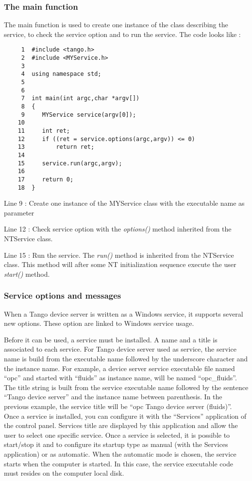 \subsubsection{The main function}

The main function is used to create one instance of the class describing
the service, to check the service option and to run the service. The
code looks like :


\begin{verbatim}
     1  #include <tango.h>
     2  #include <MYService.h>
     3  
     4  using namespace std;
     5  
     6  
     7  int main(int argc,char *argv[])
     8  {
     9     MYService service(argv[0]);
    10          
    11     int ret;
    12     if ((ret = service.options(argc,argv)) <= 0)
    13         return ret;
    14          
    15     service.run(argc,argv);
    16          
    17     return 0;
    18  }
\end{verbatim}


Line 9 : Create one instance of the MYService class with the executable
name as parameter

Line 12 : Check service option with the \emph{options()} method inherited
from the NTService class.

Line 15 : Run the service. The \emph{run()} method is inherited from
the NTService class. This method will after some NT initialization
sequence execute the user \emph{start()} method.


\subsubsection{Service options and messages}

When a Tango device server is written as a Windows service, it supports
several new options. These option are linked to Windows service
usage.

Before it can be used, a service must be installed. A name and a title
is associated to each service. For Tango device server used as service,
the service name is build from the executable name followed by the
underscore character and the instance name. For example, a device
server service executable file named ``opc'' and started with ``fluids''
as instance name, will be named ``opc\_fluids''. The title string
is built from the service executable name followed by the sentence
``Tango device server'' and the instance name between parenthesis.
In the previous example, the service title will be ``opc Tango device
server (fluids)''. Once a service is installed, you can configure
it with the ``Services'' application of the control panel. Services
title are displayed by this application and allow the user to select
one specific service. Once a service is selected, it is possible to
start/stop it and to configure its startup type as manual (with the
Services application) or as automatic. When the automatic mode is
chosen, the service starts when the computer is started. In this case,
the service executable code must resides on the computer local disk.

